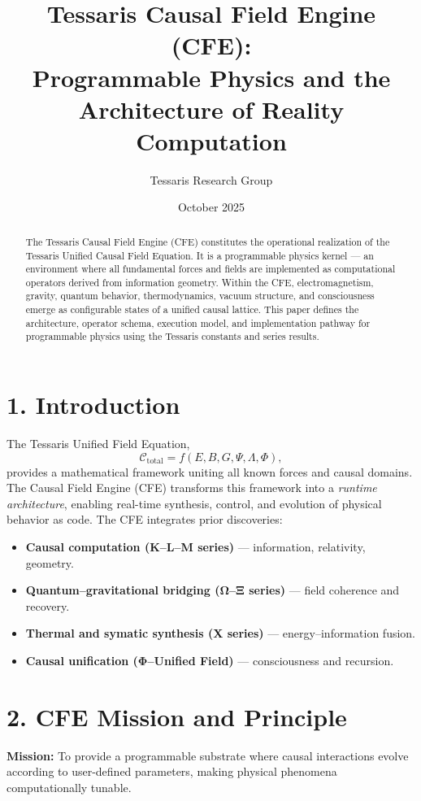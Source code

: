 \documentclass[11pt,a4paper]{article}
\title{\textbf{Tessaris Causal Field Engine (CFE):\\Programmable Physics and the Architecture of Reality Computation}}
\author{Tessaris Research Group}
\date{October 2025}
\begin{document}
\maketitle

\begin{abstract}
The Tessaris Causal Field Engine (CFE) constitutes the operational realization of the Tessaris Unified Causal Field Equation.  
It is a programmable physics kernel --- an environment where all fundamental forces and fields are implemented as computational operators derived from information geometry.  
Within the CFE, electromagnetism, gravity, quantum behavior, thermodynamics, vacuum structure, and consciousness emerge as configurable states of a unified causal lattice.  
This paper defines the architecture, operator schema, execution model, and implementation pathway for programmable physics using the Tessaris constants and series results.
\end{abstract}

\section{1. Introduction}
The Tessaris Unified Field Equation,
\[
\mathcal{C}_{\text{total}} = f(E, B, G, \Psi, \Lambda, \Phi),
\]
provides a mathematical framework uniting all known forces and causal domains.  
The Causal Field Engine (CFE) transforms this framework into a \emph{runtime architecture}, enabling real-time synthesis, control, and evolution of physical behavior as code.  
The CFE integrates prior discoveries:
\begin{itemize}
  \item \textbf{Causal computation (K--L--M series)} --- information, relativity, geometry.
  \item \textbf{Quantum--gravitational bridging (Ω--Ξ series)} --- field coherence and recovery.
  \item \textbf{Thermal and symatic synthesis (X series)} --- energy--information fusion.
  \item \textbf{Causal unification (Φ--Unified Field)} --- consciousness and recursion.
\end{itemize}

\section{2. CFE Mission and Principle}
\textbf{Mission:}  
To provide a programmable substrate where causal interactions evolve according to user-defined parameters, making physical phenomena computationally tunable.
\end{document}
